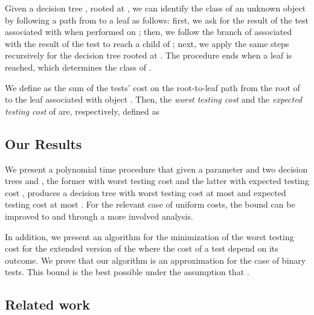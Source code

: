 \documentclass{llncs}
\begin{document}
Given a decision tree , rooted at , we can identify the class of an unknown object 
 by following a path from    to a leaf as follows:
first, we ask for the result of the test associated with  when performed on ; then,  
we follow the branch of  associated with the result of the test to
reach a child  of ; next,  we apply the same steps recursively for the decision tree rooted at .
The procedure ends when a leaf is reached, which determines the class of .

We define  as the sum of the tests' cost on 
the root-to-leaf path from the root of 
 to the leaf associated with object . 
Then, the \emph{worst testing cost}  and the \emph{expected testing cost} of  are, respectively, defined as





\begin{comment}

An important aspect of this formulation is that here the costs are associated with both the tests and 
its outcomes. Previous works consider a particular case of this problem in which 
 (i. e., the cost depends only on the test).


\end{comment}











\subsection{Our Results}
 We present a polynomial time procedure
 that given a parameter  and  two decision trees
 and , the former  with worst testing cost  and the latter with expected testing cost ,  produces
a decision tree  with worst testing cost at most  and expected
testing cost at most . For the relevant case of uniform costs,
the bound can be improved to  and  through a more involved analysis. 

In addition, we 
present an algorithm 
for the minimization of  the worst testing cost for 
the extended version of the  where the cost of a test  depend on its outcome. 
We prove that our  algorithm is  an  approximation for the 
case of binary tests.  This bound 
 is the best possible
under the assumption that .




\subsection{Related work}
\end{document}
